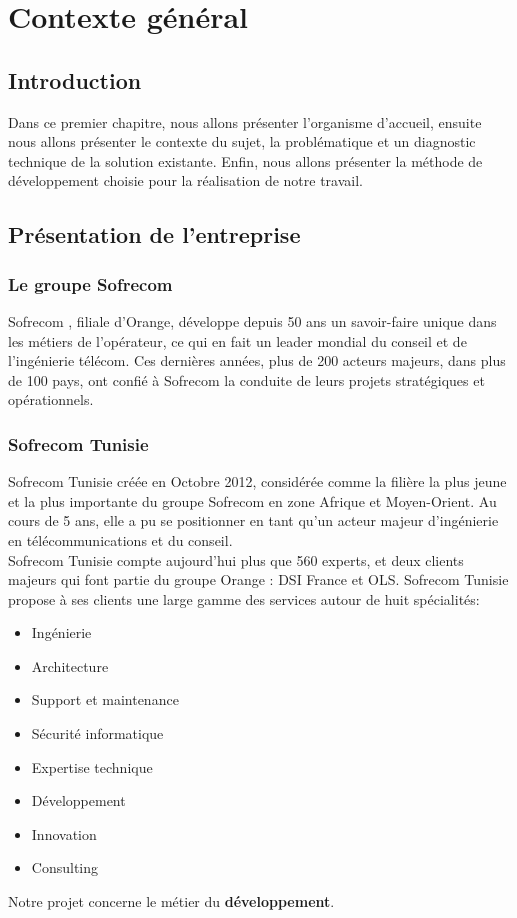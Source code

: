 \chapter{Contexte général}
\section*{Introduction}
Dans ce premier chapitre, nous allons présenter l’organisme d’accueil, ensuite nous allons présenter le contexte du sujet, la problématique et un diagnostic technique de la solution existante. Enfin, nous allons présenter la méthode de développement choisie pour la réalisation de notre travail.

\section[Présentation de l’entreprise]{Présentation de l’entreprise}

\subsection[Le groupe Sofrecom]{Le groupe Sofrecom}
Sofrecom \cite{sofrecom}, filiale d’Orange, développe depuis 50 ans un savoir-faire unique dans les métiers de l’opérateur, ce qui en fait un leader mondial du conseil et de l’ingénierie télécom. Ces dernières années, plus de 200 acteurs majeurs, dans plus de 100 pays, ont confié à Sofrecom la conduite de leurs projets stratégiques et opérationnels. 
\subsection{Sofrecom Tunisie }
Sofrecom Tunisie \cite{sofrecomTun} créée en Octobre 2012, considérée comme la filière la plus jeune et la plus importante du groupe Sofrecom en zone Afrique et Moyen-Orient. Au cours de 5 ans, elle a pu se positionner en tant qu’un acteur majeur  d’ingénierie en télécommunications et du conseil.\\
Sofrecom Tunisie compte aujourd’hui plus que 560 experts, et deux clients majeurs qui font partie du groupe Orange : DSI France et OLS. Sofrecom Tunisie propose à ses clients une large  gamme des services autour de huit spécialités:
\begin{itemize}
	\item Ingénierie
	\item Architecture
	\item Support et maintenance
	\item Sécurité informatique
	\item Expertise technique
	\item Développement
	\item Innovation 
	\item Consulting
\end{itemize}
Notre projet concerne le métier du \textbf{développement}.
